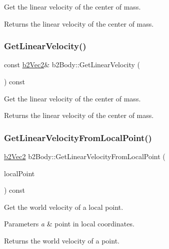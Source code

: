 Get the linear velocity of the center of mass. \begin{DoxyReturn}{Returns}
the linear velocity of the center of mass. 
\end{DoxyReturn}
\mbox{\label{classb2Body_a0d513a5a078caa4b9e00bf8e199f29a2}} 
\subsubsection{\texorpdfstring{Get\+Linear\+Velocity()}{GetLinearVelocity()}\hspace{0.1cm}{\footnotesize\ttfamily [2/2]}}
{\footnotesize\ttfamily const \hyperlink{structb2Vec2}{b2\+Vec2}\& b2\+Body\+::\+Get\+Linear\+Velocity (\begin{DoxyParamCaption}{ }\end{DoxyParamCaption}) const}

Get the linear velocity of the center of mass. \begin{DoxyReturn}{Returns}
the linear velocity of the center of mass. 
\end{DoxyReturn}
\mbox{\label{classb2Body_a0ac0a4ad6ac3c7804652d9994239dcbd}} 
\subsubsection{\texorpdfstring{Get\+Linear\+Velocity\+From\+Local\+Point()}{GetLinearVelocityFromLocalPoint()}\hspace{0.1cm}{\footnotesize\ttfamily [1/2]}}
{\footnotesize\ttfamily \hyperlink{structb2Vec2}{b2\+Vec2} b2\+Body\+::\+Get\+Linear\+Velocity\+From\+Local\+Point (\begin{DoxyParamCaption}\item[{const \hyperlink{structb2Vec2}{b2\+Vec2} \&}]{local\+Point }\end{DoxyParamCaption}) const\hspace{0.3cm}{\ttfamily [inline]}}

Get the world velocity of a local point. 
\begin{DoxyParams}{Parameters}
{\em a} & point in local coordinates. \\
\hline
\end{DoxyParams}
\begin{DoxyReturn}{Returns}
the world velocity of a point. 
\end{DoxyReturn}
\mbox{\label{classb2Body_a0ac0a4ad6ac3c7804652d9994239dcbd}} 

